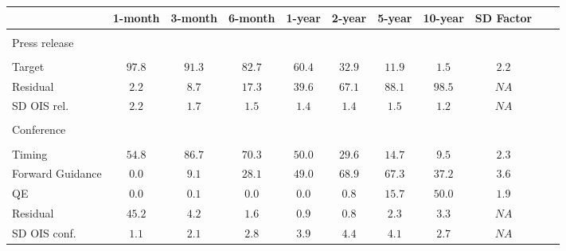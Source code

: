 \begin{tabular}{lcccccccccc}
\toprule 
 & 1-month & 3-month & 6-month & 1-year & 2-year & 5-year & 10-year & SD Factor \\
\midrule 
 &  &  &  &  &  &  &  &  &  \\
\multicolumn{2}{l}{Press release} \\
 &  &  &  &  &  &  &  &  &  \\
Target & $97.8$ & $91.3$ & $82.7$ & $60.4$ & $32.9$ & $11.9$ & $ 1.5$ & $2.2$ \\
Residual & $ 2.2$ & $ 8.7$ & $17.3$ & $39.6$ & $67.1$ & $88.1$ & $98.5$ & $ NA$ \\
\cmidrule{1-9} SD OIS rel. & $ 2.2$ & $ 1.7$ & $ 1.5$ & $ 1.4$ & $ 1.4$ & $ 1.5$ & $ 1.2$ & $ NA$ \\
 &  &  &  &  &  &  &  &  &  \\
\multicolumn{2}{l}{Conference} \\
 &  &  &  &  &  &  &  &  &  \\
Timing & $54.8$ & $86.7$ & $70.3$ & $50.0$ & $29.6$ & $14.7$ & $ 9.5$ & $2.3$ \\
Forward Guidance & $ 0.0$ & $ 9.1$ & $28.1$ & $49.0$ & $68.9$ & $67.3$ & $37.2$ & $3.6$ \\
QE & $ 0.0$ & $ 0.1$ & $ 0.0$ & $ 0.0$ & $ 0.8$ & $15.7$ & $50.0$ & $1.9$ \\
Residual & $45.2$ & $ 4.2$ & $ 1.6$ & $ 0.9$ & $ 0.8$ & $ 2.3$ & $ 3.3$ & $ NA$ \\
\cmidrule{1-9} SD OIS conf. & $ 1.1$ & $ 2.1$ & $ 2.8$ & $ 3.9$ & $ 4.4$ & $ 4.1$ & $ 2.7$ & $ NA$ \\
\bottomrule 
\end{tabular}

